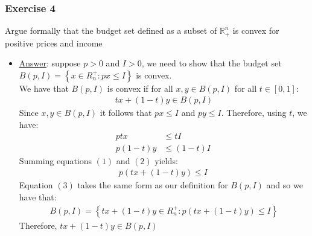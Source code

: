 \documentclass{article}
\begin{document}
\subsubsection{Exercise 4}
Argue formally that the budget set defined as a subset of $\mathbb{R}_{+}^{n}$ is convex for positive prices and income \par \vspace{0.3em}
\begin{itemize}
  \item  \underline{Answer}: suppose $p > 0$ and $I > 0$, we need to show that the budget set $B(p,I) = \left\{ x \in R^{+}_{n}: px \leq I \right\}$ is convex.\\ We have that $B(p, I)$ is convex if for all $x,y \in B(p,I)$ for all $t \in [0,1]$:
  \begin{gather*}
    tx + (1-t)y \in B(p, I)
  \end{gather*}
  Since $x, y \in B(p, I)$ it follows that $px \leq I$ and $py \leq I$. Therefore, using $t$, we have:
  \begin{align*}
    ptx &\leq tI \ \tag{1} \\
    p(1-t)y &\leq (1-t)I \ \tag{2}
  \end{align*}
  Summing equations $(1)$ and $(2)$ yields:
  \begin{gather*}
    p(tx + (1-t)y) \leq I \ \tag{3}
  \end{gather*}
  Equation $(3)$ takes the same form as our definition for $B(p,I)$ and so we have that:
  \begin{gather*}
    B(p,I) = \left\{ tx + (1-t)y \in R_{n}^{+}: p(tx + (1-t)y) \leq I \right\}
  \end{gather*}
  Therefore, $tx + (1-t)y \in B(p, I)$
\end{itemize}
\par
\vspace{6mm}
\end{document}
